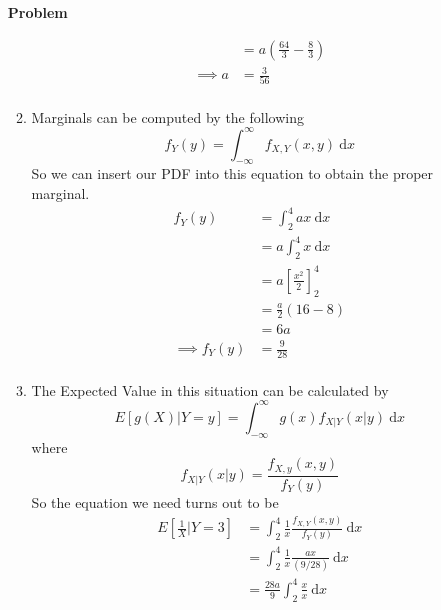\documentclass[12pt]{article}
\newenvironment{Ex}{\textbf{Problem}\vspace{.75em}\\}{}
\newcommand{\dd}[1]{\:\mathrm{d}{#1}}
\begin{document}
\begin{enumerate}
\begin{Ex}
\begin{solution}
\begin{enumerate}
\begin{equation}
\begin{aligned}
            &= a \left(\frac{64}{3} - \frac{8}{3}\right) \\
            \implies a&=\frac{3}{56} \\
          \end{aligned}
        \end{equation}
      \item Marginals can be computed by the following
        \begin{equation}
          \label{eq:1b-marginal-def}
          f_Y(y) = \int_{-\infty}^{\infty} f_{X,Y}(x,y) \dd{x}
        \end{equation}
        So we can insert our PDF into this equation to obtain the
        proper marginal.
        \begin{equation}
          \label{eq:1b-sol}
          \begin{aligned}
            f_Y(y) &= \int_{2}^{4} ax \dd{x} \\
            &= a \int_{2}^{4} x \dd{x} \\
            &= a \left[\frac{x^2}{2}\right]_2^4 \\
            &= \frac{a}{2} (16-8) \\
            &= 6a \\
            \implies f_Y(y) &= \frac{9}{28} \\
          \end{aligned}
        \end{equation}
      \item The Expected Value in this situation can be calculated
        by
        \begin{equation}
          \label{eq:1c-expected-value}
          E[g(X)|Y=y] = \int_{-\infty}^{\infty} g(x)f_{X|Y}(x|y) \dd{x}
        \end{equation}
        where
        \begin{equation}
          \label{eq:1c-conditional-value}
          f_{X|Y}(x|y) = \frac{f_{X,y}(x,y)}{f_Y(y)}
        \end{equation}
        So the equation we need turns out to be
        \begin{equation}
          \label{eq:1c-sol}
          \begin{aligned}
            E\left[\frac{1}{X}|Y=3\right] &= \int_{2}^{4}
            \frac{1}{x} \frac{f_{X,Y}(x,y)}{f_Y(y)} \dd{x} \\
            &= \int_{2}^{4} \frac{1}{x} \frac{ax}{(9/28)}
            \dd{x} \\
            &= \frac{28a}{9} \int_{2}^{4} \frac{x}{x} \dd{x} \\

\end{aligned}
\end{equation}
\end{enumerate}
\end{solution}
\end{Ex}
\end{enumerate}
\end{document}
